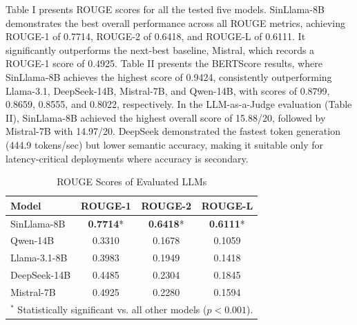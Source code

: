 \documentclass[conference]{IEEEtran}
\begin{document}
Table I presents ROUGE scores for all the tested five models. SinLlama-8B demonstrates the best overall performance across all ROUGE metrics, achieving ROUGE-1 of 0.7714, ROUGE-2 of 0.6418, and ROUGE-L of 0.6111. It significantly outperforms the next-best baseline, Mistral, which records a ROUGE-1 score of 0.4925. Table II presents the BERTScore results, where SinLlama-8B achieves the highest score of 0.9424, consistently outperforming Llama-3.1, DeepSeek-14B, Mistral-7B, and Qwen-14B, with scores of 0.8799, 0.8659, 0.8555, and 0.8022, respectively. In the LLM-as-a-Judge evaluation (Table II), SinLlama-8B achieved the highest overall score of 15.88/20, followed by Mistral-7B with 14.97/20. DeepSeek demonstrated the fastest token generation (444.9 tokens/sec) but lower semantic accuracy, making it suitable only for latency-critical deployments where accuracy is secondary.
\vspace{-1.0em}
\begin{table}[htbp]
\caption{ROUGE Scores of Evaluated LLMs}
\vspace{-1.5em}
\label{tab1}
\begin{center}
\begin{tabular}{lccc}
\toprule
\textbf{Model} & \textbf{ROUGE-1} & \textbf{ROUGE-2} & \textbf{ROUGE-L} \\
\midrule
SinLlama-8B & \textbf{0.7714}* & \textbf{0.6418}* & \textbf{0.6111}* \\
Qwen-14B & 0.3310 & 0.1678 & 0.1059 \\
Llama-3.1-8B & 0.3983 & 0.1949 & 0.1418 \\
DeepSeek-14B & 0.4485 & 0.2304 & 0.1845 \\
Mistral-7B & 0.4925 & 0.2280 & 0.1594 \\
\bottomrule
\multicolumn{4}{l}{$^{\mathrm{*}}$ Statistically significant vs. all other models ($p < 0.001$).}
\end{tabular}
\end{center}
\end{table}
\vspace{-1.5em}
\begin{table}[htbp]
\caption{BERTScore and LLM-as-a-Judge Evaluation}
\vspace{-1.5em}
\label{tab2}
\begin{center}
\end{center}
\end{table}
\end{document}
